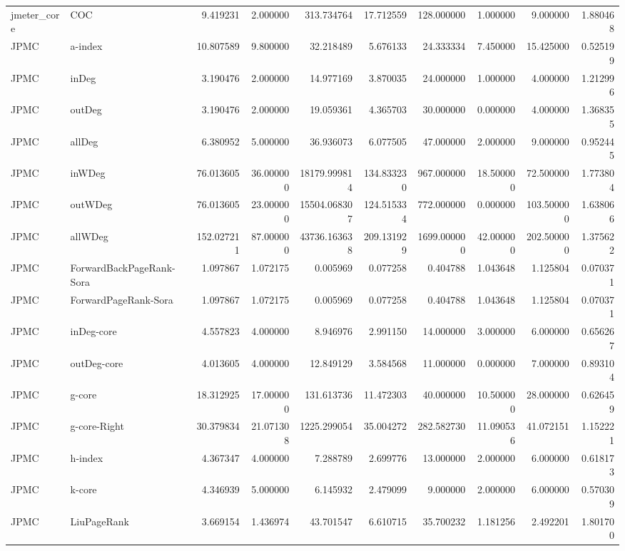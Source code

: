 \begin{tabular}{llrrrrrrrr}
jmeter_core & COC & 9.419231 & 2.000000 & 313.734764 & 17.712559 & 128.000000 & 1.000000 & 9.000000 & 1.880468 \\
JPMC & a-index & 10.807589 & 9.800000 & 32.218489 & 5.676133 & 24.333334 & 7.450000 & 15.425000 & 0.525199 \\
JPMC & inDeg & 3.190476 & 2.000000 & 14.977169 & 3.870035 & 24.000000 & 1.000000 & 4.000000 & 1.212996 \\
JPMC & outDeg & 3.190476 & 2.000000 & 19.059361 & 4.365703 & 30.000000 & 0.000000 & 4.000000 & 1.368355 \\
JPMC & allDeg & 6.380952 & 5.000000 & 36.936073 & 6.077505 & 47.000000 & 2.000000 & 9.000000 & 0.952445 \\
JPMC & inWDeg & 76.013605 & 36.000000 & 18179.999814 & 134.833230 & 967.000000 & 18.500000 & 72.500000 & 1.773804 \\
JPMC & outWDeg & 76.013605 & 23.000000 & 15504.068307 & 124.515334 & 772.000000 & 0.000000 & 103.500000 & 1.638066 \\
JPMC & allWDeg & 152.027211 & 87.000000 & 43736.163638 & 209.131929 & 1699.000000 & 42.000000 & 202.500000 & 1.375622 \\
JPMC & ForwardBackPageRank-Sora & 1.097867 & 1.072175 & 0.005969 & 0.077258 & 0.404788 & 1.043648 & 1.125804 & 0.070371 \\
JPMC & ForwardPageRank-Sora & 1.097867 & 1.072175 & 0.005969 & 0.077258 & 0.404788 & 1.043648 & 1.125804 & 0.070371 \\
JPMC & inDeg-core & 4.557823 & 4.000000 & 8.946976 & 2.991150 & 14.000000 & 3.000000 & 6.000000 & 0.656267 \\
JPMC & outDeg-core & 4.013605 & 4.000000 & 12.849129 & 3.584568 & 11.000000 & 0.000000 & 7.000000 & 0.893104 \\
JPMC & g-core & 18.312925 & 17.000000 & 131.613736 & 11.472303 & 40.000000 & 10.500000 & 28.000000 & 0.626459 \\
JPMC & g-core-Right & 30.379834 & 21.071308 & 1225.299054 & 35.004272 & 282.582730 & 11.090536 & 41.072151 & 1.152221 \\
JPMC & h-index & 4.367347 & 4.000000 & 7.288789 & 2.699776 & 13.000000 & 2.000000 & 6.000000 & 0.618173 \\
JPMC & k-core & 4.346939 & 5.000000 & 6.145932 & 2.479099 & 9.000000 & 2.000000 & 6.000000 & 0.570309 \\
JPMC & LiuPageRank & 3.669154 & 1.436974 & 43.701547 & 6.610715 & 35.700232 & 1.181256 & 2.492201 & 1.801700 \\

\end{tabular}
